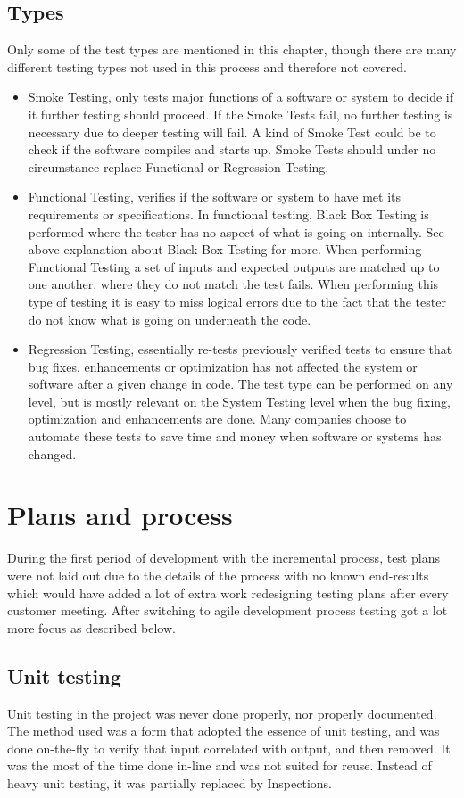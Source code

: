 \subsection{Types}
Only some of the test types are mentioned in this chapter, though there are many different testing types not used in this process and therefore not covered.
\begin{itemize}
\item Smoke Testing, only tests major functions of a software or system to decide if it further testing should proceed. If the Smoke Tests fail, no further testing is necessary due to deeper testing will fail. A kind of Smoke Test could be to check if the software compiles and starts up. Smoke Tests should under no circumstance replace Functional or Regression Testing.
\item Functional Testing, verifies if the software or system to have met its requirements or specifications. In functional testing, Black Box Testing is performed where the tester has no aspect of what is going on internally. See above explanation about Black Box Testing for more. When performing Functional Testing a set of inputs and expected outputs are matched up to one another, where they do not match the test fails. When performing this type of testing it is easy to miss logical errors due to the fact that the tester do not know what is going on underneath the code.
\item Regression Testing, essentially re-tests previously verified tests to ensure that bug fixes, enhancements or optimization has not affected the system or software after a given change in code. The test type can be performed on any level, but is mostly relevant on the System Testing level when the bug fixing, optimization and enhancements are done. Many companies choose to automate these tests to save time and money when software or systems has changed.
\end{itemize}
\section{Plans and process}
During the first period of development with the incremental process, test plans were not laid out due to the details of the process with no known end-results which would have added a lot of extra work redesigning testing plans after every customer meeting. After switching to agile development process testing got a lot more focus as described below.
\subsection{Unit testing}
Unit testing in the project was never done properly, nor properly documented. The method used was a form that adopted the essence of unit testing, and was done on-the-fly to verify that input correlated with output, and then removed. It was the most of the time done in-line and was not suited for reuse. Instead of heavy unit testing, it was partially replaced by Inspections.
